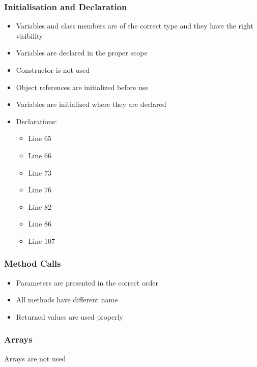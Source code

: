 \subsubsection{Initialisation and Declaration}
\begin{itemize}
\item Variables and class members are of the correct type and they have the right visibility
\item Variables are declared in the proper scope
\item Constructor is not used
\item Object references are initialized before use
\item Variables are initialized where they are declared
\item Declarations:
\begin{itemize}
\item Line 65
\item Line 66
\item Line 73
\item Line 76
\item Line 82
\item Line 86
\item Line 107
\end{itemize}
\end{itemize}


\subsubsection{Method Calls}
\begin{itemize}
\item Parameters are presented in the correct order
\item All methods have different name
\item Returned values are used properly
\end{itemize}


\subsubsection{Arrays}
Arrays are not used




